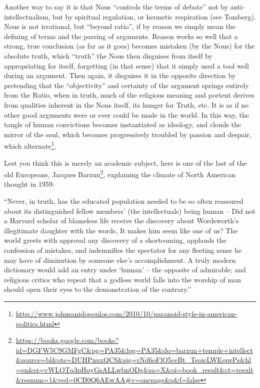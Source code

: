 Another way to say it is that Nous ``controls the terms of debate'' not by anti-intellectualism, but by spiritual regulation, or hermetic respiration (see Tomberg). Nous is not irrational, but ``beyond ratio'', if by reason we simply mean the defining of terms and the parsing of arguments. Reason works so well that a strong, true conclusion (as far as it goes) becomes mistaken (by the Nous) for the absolute truth, which ``truth'' the Nous then disguises from itself by appropriating for itself, forgetting (in that sense) that it simply used a tool well during an argument. Then again, it disguises it in the opposite direction by pretending that the ``objectivity'' and certainty of the argument springs entirely from the Ratio, when in truth, much of the religious meaning and portent derives from qualities inherent in the Nous itself, its hunger for Truth, etc. It is as if no other good arguments were or ever could be made in the world. In this way, the tangle of human convictions becomes instantiated as ideology, and clouds the mirror of the soul, which becomes progressively troubled by passion and despair, which alternate\footnote{\url{http://www.johnsanidopoulos.com/2010/10/paranoid-style-in-american-politics.html}}.

Lest you think this is merely an academic subject, here is one of the last of the old Europeans, Jacques Barzun\footnote{\url{https://books.google.com/books?id=DGFW5C9GMFgC&pg=PA35&lpg=PA35&dq=barzun+temple+intellect&source=bl&ots=DUHPnuxQCS&sig=rNd6oFlO5ceBt\_TeoicLWEoprPs&hl=en&ei=vWLOTq3pHuyGsALLwbnODg&sa=X&oi=book\_result&ct=result&resnum=1&ved=0CB0Q6AEwAA\#v=onepage&q&f=false}}, explaining the climate of North American thought in 1959:

\begin{quotex}
``Never, in truth, has the educated population needed to be so often reassured about its distinguished fellow members' (the intellectuals) being human -- Did not a Harvard scholar of blameless life receive the discovery about Wordsworth's illegitimate daughter with the words, It makes him seem like one of us? The world greets with approval any discovery of a shortcoming, applauds the confession of mistakes, and indemnifies the spectator for any fleeting sense he may have of diminution by someone else's accomplishment. A truly modern dictionary would add an entry under `human' -- the opposite of admirable; and religious critics who repeat that a godless world falls into the worship of man should open their eyes to the demonstration of the contrary.''
\end{quotex}


